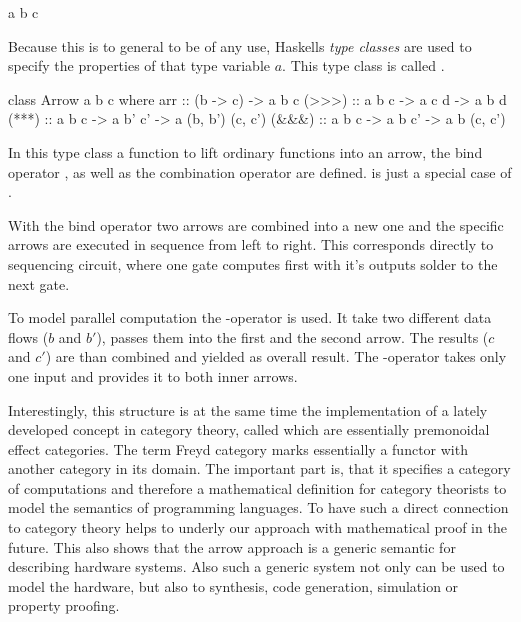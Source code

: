 \documentclass{article}
\begin{document}
\begin{center}
\begin{minipage}{.2\textwidth}
\begin{haskell**}
a b c
\end{haskell**} \end{minipage} \end{center}

Because this is to general to be of any use, Haskells \emph{type classes} are used to specify the properties of that type variable $a$. This
type class is called . 

\begin{code}
class Arrow a b c where 
  arr   :: (b -> c) -> a b c
  (>>>) :: a b c    -> a c d   -> a b d
  (***) :: a b c    -> a b' c' -> a (b, b') (c, c')
  (&&&) :: a b c    -> a b  c' -> a  b      (c, c')
\end{code}

In this type class a function  to lift ordinary functions into an arrow, the bind operator \hs{(>>>)}, as well as the combination
operator \hs{(***)} are defined. \hs{(&&&)} is just a special case of \hs{(***)}. 

\par
With the bind operator \hs{(>>>)} two arrows are combined into a new one and the specific arrows are executed in sequence from left to
right. This corresponds directly to sequencing circuit, where one gate computes first with it's outputs solder to the next gate. 

\par 
To model parallel computation the \hs{(***)}-operator is used. It take two different data flows ($b$ and $b'$), passes them into the first
and the second arrow. The results ($c$ and $c'$) are than combined and yielded as overall result. The \hs{(&&&)}-operator takes only one
input and provides it to both inner arrows.


\par
Interestingly, this structure is at the same time the implementation of a lately developed concept in category theory, called  which are essentially premonoidal effect categories\cite{Heunen06arrows, Hughes98generalisingmonads,PatersonRA}. The term Freyd
category marks essentially a functor with another category in its domain. The important part is, that it specifies a category of
computations and therefore a mathematical definition for category theorists to model the semantics of programming languages. To have such a
direct connection to category theory helps to underly our approach with mathematical proof in the future. This also shows that the arrow
approach is a generic semantic for describing hardware systems. Also such a generic system not only can be used to model the hardware, but
also to synthesis, code generation, simulation or property proofing. 
\end{document}

